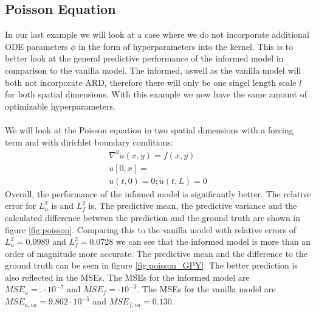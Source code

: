 \documentclass{article}
\begin{document}
\subsection{Poisson Equation}
In our last example we will look at a case where we do not incorporate additional ODE parameters $\phi$ in the form of hyperparameters into the kernel. This is to better look at the general predictive performance of the informed model in comparison to the vanilla model. The informed, aswell as the vanilla model will both not incorporate ARD, therefore there will only be one singel length scale $l$ for both spatial dimensions. With this example we now have the same amount of optimizable hyperparameters. \\
\\
 We will look at the Poisson equation in two spatial dimensions with a
forcing term and with dirichlet boundary conditions:
\begin{equation}
    \begin{aligned}
        \nabla^2 u(x,y) = f(x,y) \\ u[0,x] = \\ u(t,0) = 0; u(t,L) = 0
    \end{aligned}
\end{equation}
 Overall, the performance of the infomed model is significantly better. The relative error for $L^2_u$ is and $L^2_f$ is. The predictive mean, the predictive variance and the calculated difference between the prediction and the ground truth are shown in figure \ref{fig:poisson}. Comparing this to the vanilla model with relative errors of $L^2_u = 0.0989$ and $L^2_f = 0.0728$ we can see that the informed model is more than an order of magnitude more accurate. The predictive mean and the difference to the ground truth can be seen in figure \ref{fig:poisson_GPY}. The better prediction is also reflected in the MSEs. The MSEs for the informed model are $MSE_u = . \cdot 10^{-7}$ and $MSE_f =  \cdot 10^{-3}$. The MSEs for the vanilla model are $MSE_{u,va} = 9.862  \cdot 10^{-5}$ and $MSE_{f,va} = 0.130$.\\
\\
\end{document}
